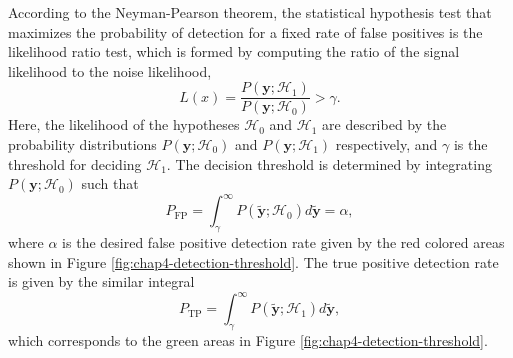 According to the Neyman-Pearson theorem, the statistical hypothesis test that maximizes the probability of detection for a fixed rate of false positives is the likelihood ratio test, which is formed by computing the ratio of the signal likelihood to the noise likelihood,
\begin{equation}
    L(x)=\frac{P(\bm{y};\mathcal{H}_1)}{P(\bm{y};\mathcal{H}_0)}>\gamma.
\end{equation}
Here, the likelihood of the hypotheses $\mathcal{H}_0$ and $\mathcal{H}_1$ are described by the probability distributions $P(\bm{y};\mathcal{H}_0)$ and $P(\bm{y};\mathcal{H}_1)$ respectively, and $\gamma$ is the threshold for deciding $\mathcal{H}_1$. The decision threshold is determined by integrating $P(\bm{y};\mathcal{H}_0)$ such that 
\begin{equation}
    P_{\textrm{FP}}=\int_\gamma^\infty{P(\tilde{\bm{y}};\mathcal{H}_0)d\tilde{\bm{y}}}=\alpha,
\end{equation}
where $\alpha$ is the desired false positive detection rate given by the red colored areas shown in Figure \ref{fig:chap4-detection-threshold}. The true positive detection rate is given by the similar integral 
\begin{equation}
    P_{\textrm{TP}}=\int_\gamma^\infty{P(\tilde{\bm{y}};\mathcal{H}_1)d\tilde{\bm{y}}},
\end{equation}
which corresponds to the green areas in Figure \ref{fig:chap4-detection-threshold}.

